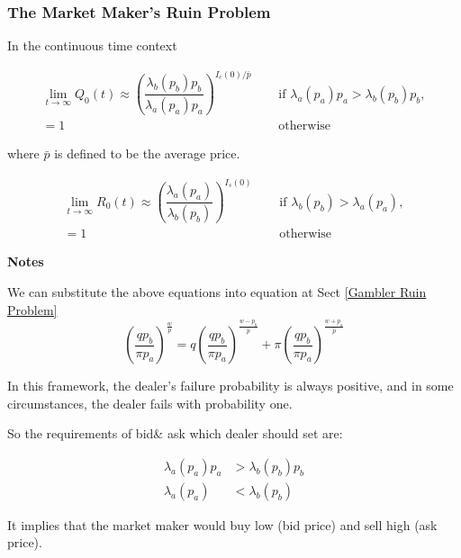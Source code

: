 \documentclass[a4]{article}
\begin{document}
\subsubsection{The Market Maker's Ruin Problem}
In the continuous time context\par 
$$
\begin{aligned}
\lim_{t\rightarrow \infty}Q_{0}(t)\approx \left(\dfrac{\lambda_{b}(p_{b})p_{b}}{\lambda_{a}(p_{a})p_{a}}\right)^{I_{c}(0)/\bar{p}}&\quad \text{ if } \lambda_{a}(p_{a})p_{a}>\lambda_{b}(p_{b})p_{b},\\=1 &\quad  \text{ otherwise}
\end{aligned}
$$\par 
where $\bar{p}$ is defined to be the average price.\par 
$$
\begin{aligned}
\lim_{t\rightarrow \infty}R_{0}(t)\approx \left(\dfrac{\lambda_{a}(p_{a})}{\lambda_{b}(p_{b})}\right)^{I_{s}(0)}&\quad \text{ if } \lambda_{b}(p_{b})>\lambda_{a}(p_{a}),\\=1 &\quad  \text{ otherwise}
\end{aligned}
$$\par 
\noindent \textbf{Notes}\par 
\bigbreak 
We can substitute the above equations into equation at Sect \ref{Gambler Ruin Problem}
$$
\left(\dfrac{qp_{b}}{\pi p_{a}}\right)^{\frac{w}{p}} = q\left(\dfrac{qp_{b}}{\pi p_{a}}\right)^{\frac{w-p_{b}}{\bar{p}}} + \pi\left(\dfrac{qp_{b}}{\pi p_{a}}\right)^{\frac{w+p_{a}}{\bar{p}}}
$$\par 
\bigbreak
\noindent In this framework, the dealer's failure probability is always positive, and in some circumstances, the dealer fails with probability one.\par 
\bigbreak 
\noindent So the requirements of bid\& ask which  dealer should set are:\par 
$$
\begin{aligned}
\lambda_{a}(p_{a})p_{a}&>\lambda_{b}(p_{b})p_{b}\\
\lambda_{a}(p_{a})&<\lambda_{b}(p_{b})
\end{aligned}
$$\par 
\noindent It implies that the market maker would buy low (bid price) and sell high (ask price).
\end{document}
